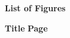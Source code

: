 \begin{titlepage}

    \begin{center}
        {\fontsize{14}{18}\selectfont \textbf{List of Figures}}
    \end{center}

    \vspace*{48pt} 

    \noindent
    {\fontsize{12}{14}\selectfont \textbf{Title}} \hfill {\fontsize{12}{14}\selectfont \textbf{Page}} \\[12pt] %

    {\fontsize{12}{18}\selectfont
    \makeatletter
    \renewcommand{\cftfigleader}{\cftdotfill{\cftdotsep}}
    \setlength{\cftfigindent}{0pt}
    
    \makeatother
    }

\end{titlepage}


